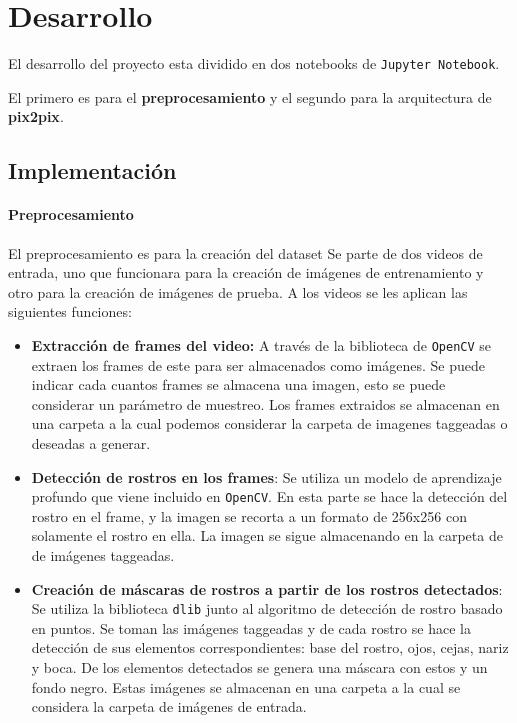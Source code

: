 \documentclass[10pt,journal,compsoc]{IEEEtran}\usepackage[T1]{fontenc}                              %
\begin{document}
\hfill

\section{Desarrollo}

El desarrollo del proyecto esta dividido en dos notebooks de
\texttt{Jupyter\ Notebook}.

El primero es para el \textbf{preprocesamiento} y el segundo para la
arquitectura de \textbf{pix2pix}.

\subsection{Implementación}

\paragraph{Preprocesamiento}

El preprocesamiento es para la creación del dataset Se parte de dos
videos de entrada, uno que funcionara para la creación de imágenes de
entrenamiento y otro para la creación de imágenes de prueba. A los
videos se les aplican las siguientes funciones:

\begin{itemize}
\item
  \textbf{Extracción de frames del video:} A través de la biblioteca de
  \texttt{OpenCV} se extraen los frames de este para ser almacenados
  como imágenes. Se puede indicar cada cuantos frames se almacena una
  imagen, esto se puede considerar un parámetro de muestreo. Los frames
  extraidos se almacenan en una carpeta a la cual podemos considerar la
  carpeta de imagenes taggeadas o deseadas a generar.
\item
  \textbf{Detección de rostros en los frames}: Se utiliza un modelo de
  aprendizaje profundo que viene incluido en \texttt{OpenCV}. En esta
  parte se hace la detección del rostro en el frame, y la imagen se
  recorta a un formato de 256x256 con solamente el rostro en ella. La
  imagen se sigue almacenando en la carpeta de de imágenes taggeadas.
\item
  \textbf{Creación de máscaras de rostros a partir de los rostros
  detectados}: Se utiliza la biblioteca \texttt{dlib} junto al algoritmo
  de detección de rostro basado en puntos. Se toman las imágenes
  taggeadas y de cada rostro se hace la detección de sus elementos
  correspondientes: base del rostro, ojos, cejas, nariz y boca. De los
  elementos detectados se genera una máscara con estos y un fondo negro.
  Estas imágenes se almacenan en una carpeta a la cual se considera la
  carpeta de imágenes de entrada.
\end{itemize}
\end{document}
